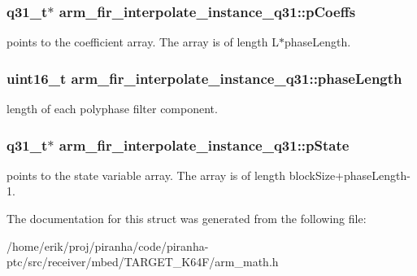 \subsubsection[{\texorpdfstring{p\+Coeffs}{pCoeffs}}]{\setlength{\rightskip}{0pt plus 5cm}q31\+\_\+t$\ast$ arm\+\_\+fir\+\_\+interpolate\+\_\+instance\+\_\+q31\+::p\+Coeffs}\hypertarget{structarm__fir__interpolate__instance__q31_afa719433687e1936ec3403d0d32f06e6}{}\label{structarm__fir__interpolate__instance__q31_afa719433687e1936ec3403d0d32f06e6}
points to the coefficient array. The array is of length L$\ast$phase\+Length. 
\subsubsection[{\texorpdfstring{phase\+Length}{phaseLength}}]{\setlength{\rightskip}{0pt plus 5cm}uint16\+\_\+t arm\+\_\+fir\+\_\+interpolate\+\_\+instance\+\_\+q31\+::phase\+Length}\hypertarget{structarm__fir__interpolate__instance__q31_a5d243796584afc7cd6c557f00b7acca5}{}\label{structarm__fir__interpolate__instance__q31_a5d243796584afc7cd6c557f00b7acca5}
length of each polyphase filter component. 
\subsubsection[{\texorpdfstring{p\+State}{pState}}]{\setlength{\rightskip}{0pt plus 5cm}q31\+\_\+t$\ast$ arm\+\_\+fir\+\_\+interpolate\+\_\+instance\+\_\+q31\+::p\+State}\hypertarget{structarm__fir__interpolate__instance__q31_addde04514b6e6ac72be3d609f0398b1a}{}\label{structarm__fir__interpolate__instance__q31_addde04514b6e6ac72be3d609f0398b1a}
points to the state variable array. The array is of length block\+Size+phase\+Length-\/1. 

The documentation for this struct was generated from the following file\+:\begin{DoxyCompactItemize}
\item 
/home/erik/proj/piranha/code/piranha-\/ptc/src/receiver/mbed/\+T\+A\+R\+G\+E\+T\+\_\+\+K64\+F/arm\+\_\+math.\+h\end{DoxyCompactItemize}
